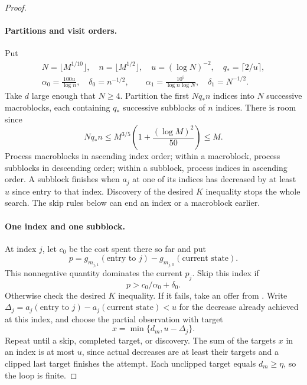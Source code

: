 \begin{proof}
\paragraph{Partitions and visit orders.}
Put
\begin{equation}
 \begin{gathered}
 N=\lfloor M^{1/10}\rfloor,\quad n=\lfloor M^{1/2}\rfloor,\quad
 u=(\log N)^{-2},\quad q_*=\lceil2/u\rceil,\\
 \alpha_0=\frac{100u}{\log n},\quad\delta_0=n^{-1/2},\qquad
 \alpha_1=\frac{10^5}{\log n\log N},\quad\delta_1=N^{-1/2}.
 \end{gathered}
 \label{entropy-refinement:skip-parameters}
\end{equation}
Take $d$ large enough that $N\ge4$. Partition the first $Nq_*n$ indices into
$N$ successive macroblocks, each containing $q_*$ successive subblocks of
$n$ indices. There is room since
\[
 Nq_*n\le M^{3/5}\left(1+\frac{(\log M)^2}{50}\right)\le M.
\]
Process macroblocks in ascending index order; within a macroblock, process
subblocks in descending order; within a subblock, process indices in
ascending order. A subblock finishes when $a_j$ at one of its indices has
decreased by at least $u$ since entry to that index. Discovery of the desired
$K$ inequality stops the whole search. The skip rules below can end an index
or a macroblock earlier.

\paragraph{One index and one subblock.}
At index $j$, let $c_0$ be the cost spent there so far and put
\[
 p=g_{m_{j,1}}(\text{entry to }j)-g_{m_{j,0}}(\text{current state}).
\]
This nonnegative quantity dominates the current $p_j$. Skip this index if
\begin{equation}
 p>c_0/\alpha_0+\delta_0.
 \label{entropy-refinement:index-skip}
\end{equation}
Otherwise check the desired $K$ inequality. If it fails, take an offer from
. Write
$\Delta_j=a_j(\text{entry to }j)-a_j(\text{current state})<u$
for the decrease already achieved at this index, and choose the partial
observation with target
\[
 x=\min\{d_m,u-\Delta_j\}.
\]
Repeat until a skip, completed target, or discovery. The sum of the targets
$x$ in an index is at most $u$, since actual decreases are at least their
targets and a clipped last target finishes the attempt. Each unclipped
target equals $d_m\ge\eta$, so the loop is finite.


\end{proof}
